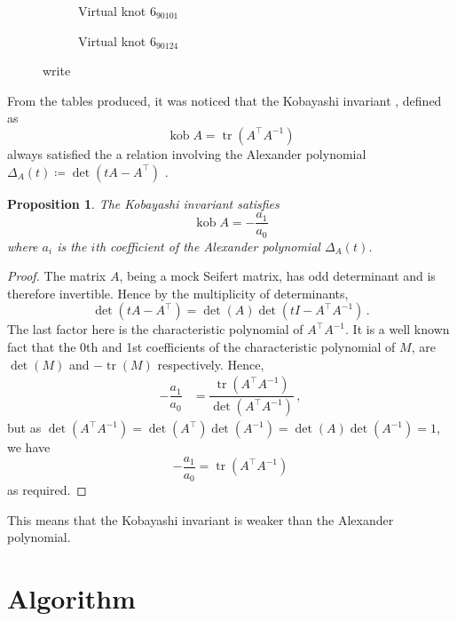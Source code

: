 \documentclass[12pt]{report}
\newcommand{\kob}{\operatorname{kob}}
\newtheorem*{proposition}{Proposition}
\begin{document}
\begin{figure}[hbt!]
	\centering
	\hspace*{\fill}
	\begin{subfigure}[b]{0.4 \textwidth}
		\centering
		\def\svgscale{0.35}
		
		\caption{Virtual knot $6_{90101}$}
		\label{fig:6-90101_vknot}
	\end{subfigure}
	\hspace*{\fill}	\hspace*{\fill}	\hspace*{\fill}
	\begin{subfigure}[b]{0.4 \textwidth}
		\centering
		\def\svgscale{0.35}
		
		\caption{Virtual knot $6_{90124}$}
		\label{fig:6-90124_vknot}
	\end{subfigure}
	\hspace*{\fill} 
	\caption{write}
	\label{fig:counterexamples}
\end{figure}

From the tables produced, it was noticed that the Kobayashi invariant \cite{new-invariant-under-congruence}, defined as
\[\kob A = \operatorname{tr}(A^{\top}A^{-1})\]
always satisfied the a relation involving the Alexander polynomial $\Delta_{A}(t) \coloneq \det(tA - A^{\top})$ \cite{mock-seifert-matrices}.

\begin{proposition}
The Kobayashi invariant satisfies
\[\kob A = -\dfrac{a_{1}}{a_{0}}\]
where $a_{i}$ is the $i$th coefficient of the Alexander polynomial $\Delta_{A}(t)$.
\end{proposition}
\begin{proof}
The matrix $A$, being a mock Seifert matrix, has odd determinant \cite{mock-seifert-matrices} and is therefore invertible. Hence by the multiplicity of determinants,
\[\det(tA - A^{\top}) = \det(A)\det(tI - A^{\top}A^{-1})\,.\]
The last factor here is the characteristic polynomial of $A^{\top}A^{-1}$. It is a well known fact that the 0th and 1st coefficients of the characteristic polynomial of $M$, are $\det(M)$ and $-\operatorname{tr}(M)$ respectively. Hence,
\begin{align*}
-\dfrac{a_{1}}{a_{0}}	& = \dfrac{\operatorname{tr}(A^{\top}A^{-1})}{\det(A^{\top}A^{-1})}\,,
\end{align*}
but as $\det(A^{\top}A^{-1}) = \det(A^{\top})\det(A^{-1}) = \det(A)\det(A^{-1}) = 1$, we have
\[-\dfrac{a_{1}}{a_{0}} = \operatorname{tr}(A^{\top}A^{-1})\]
as required.
\end{proof}

This means that the Kobayashi invariant is weaker than the Alexander polynomial.


\newpage
\printbibliography[title=References]


\appendix
{}
\titlespacing*{\chapter}{0pt}{40pt}{30pt}

\chapter{Algorithm}
\end{document}
